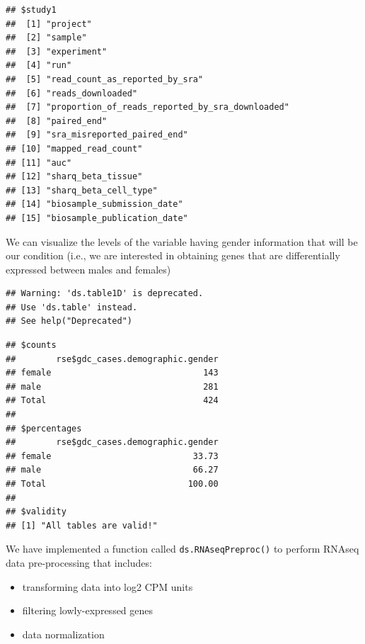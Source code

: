 \documentclass[
]{book}
\newenvironment{Shaded}{\begin{snugshade}}{\end{snugshade}}
\newcommand{\FunctionTok}[1]{\textcolor[rgb]{0.00,0.00,0.00}{#1}}
\newcommand{\NormalTok}[1]{#1}
\newcommand{\StringTok}[1]{\textcolor[rgb]{0.31,0.60,0.02}{#1}}
\providecommand{\tightlist}{%
  \setlength{\itemsep}{0pt}\setlength{\parskip}{0pt}}
\begin{document}
\begin{verbatim}
## $study1
##  [1] "project"                                       
##  [2] "sample"                                        
##  [3] "experiment"                                    
##  [4] "run"                                           
##  [5] "read_count_as_reported_by_sra"                 
##  [6] "reads_downloaded"                              
##  [7] "proportion_of_reads_reported_by_sra_downloaded"
##  [8] "paired_end"                                    
##  [9] "sra_misreported_paired_end"                    
## [10] "mapped_read_count"                             
## [11] "auc"                                           
## [12] "sharq_beta_tissue"                             
## [13] "sharq_beta_cell_type"                          
## [14] "biosample_submission_date"                     
## [15] "biosample_publication_date"
\end{verbatim}

We can visualize the levels of the variable having gender information that will be our condition (i.e., we are interested in obtaining genes that are differentially expressed between males and females)

\begin{Shaded}
\end{Shaded}

\begin{verbatim}
## Warning: 'ds.table1D' is deprecated.
## Use 'ds.table' instead.
## See help("Deprecated")
\end{verbatim}

\begin{verbatim}
## $counts
##        rse$gdc_cases.demographic.gender
## female                              143
## male                                281
## Total                               424
## 
## $percentages
##        rse$gdc_cases.demographic.gender
## female                            33.73
## male                              66.27
## Total                            100.00
## 
## $validity
## [1] "All tables are valid!"
\end{verbatim}

We have implemented a function called \texttt{ds.RNAseqPreproc()} to perform RNAseq data pre-processing that includes:

\begin{itemize}
\tightlist
\item
  transforming data into log2 CPM units
\item
  filtering lowly-expressed genes
\item
  data normalization
\end{itemize}
\end{document}
